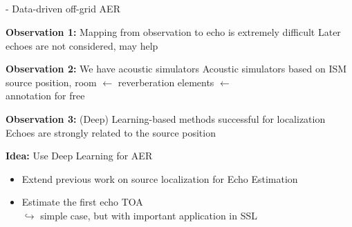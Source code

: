 
\subsection{\lantern}

\begin{frame}{\lantern - Data-driven off-grid AER}

    \begin{block}{\textbf{Observation 1:} Mapping from observation to echo is extremely difficult}
        Later echoes are not considered, may help
    \end{block}

    \begin{block}{\textbf{Observation 2:} We have acoustic simulators}
        Acoustic simulators based on ISM
        \\source position, room $\leftarrow$ reverberation elements $\leftarrow$
        \\annotation for free
    \end{block}

    \begin{block}{\textbf{Observation 3:} (Deep) Learning-based methods successful for localization}
        Echoes are strongly related to the source position
    \end{block}

    \begin{alertblock}{\textbf{Idea:} Use Deep Learning for AER}
        \begin{itemize}
            \item Extend previous work on source localization for Echo Estimation
            \item Estimate the first echo TOA
            \\$\hookrightarrow$ simple case, but with important application in SSL
        \end{itemize}
    \end{alertblock}

\end{frame}

